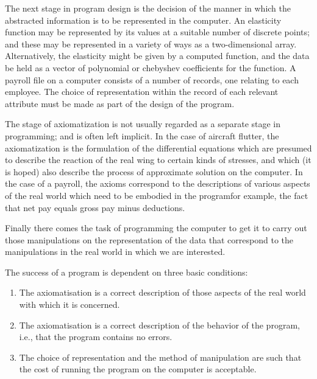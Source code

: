 \documentclass[twoside,11pt]{book}
\begin{document}
The next stage in program design is the decision of the manner in which the abstracted information is to be represented in the computer. An elasticity function may be represented by its values at a suitable number of discrete points; and these may be represented in a variety of ways as a two-dimensional array. Alternatively, the elasticity might be given by a computed function, and the data be held as a vector of polynomial or chebyshev coefficients for the function. A payroll file on a computer consists of a number of records, one relating to each employee. The choice of representation within the record of each relevant attribute must be made as part of the design of the program.

The stage of axiomatization is not usually regarded as a separate stage in programming; and is often left implicit. In the case of aircraft flutter, the axiomatization is the formulation of the differential equations which are presumed to describe the reaction of the real wing to certain kinds of stresses, and which (it is hoped) also describe the process of approximate solution on the computer. In the case of a payroll, the axioms correspond to the descriptions of various aspects of the real world which need to be embodied in the program\textemdash{}for example, the fact that net pay equals gross pay minus deductions.

Finally there comes the task of programming the computer to get it to carry out those manipulations on the representation of the data that correspond to the manipulations in the real world in which we are interested. 

The success of a program is dependent on three basic conditions:

\begin{enumerate}[wide, nosep, label=(\arabic*)]
	\item The axiomatisation is a correct description of those aspects of the real world with which it is concerned.
	\item The axiomatisation is a correct description of the behavior of the program, i.e., that the program contains no errors.
	\item The choice of representation and the method of manipulation are such that the cost of running the program on the computer is acceptable.
\end{enumerate}
\end{document}
